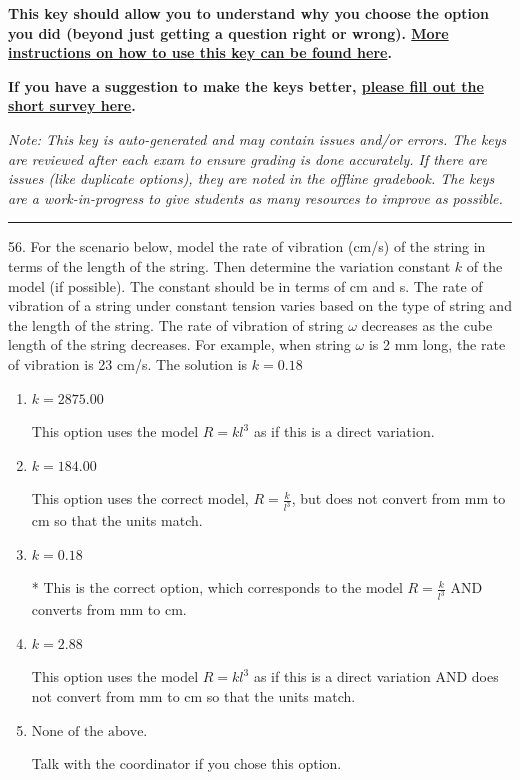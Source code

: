 \documentclass{extbook}[14pt]
\begin{document}
\textbf{This key should allow you to understand why you choose the option you did (beyond just getting a question right or wrong). \href{https://xronos.clas.ufl.edu/mac1105spring2020/courseDescriptionAndMisc/Exams/LearningFromResults}{More instructions on how to use this key can be found here}.}

\textbf{If you have a suggestion to make the keys better, \href{https://forms.gle/CZkbZmPbC9XALEE88}{please fill out the short survey here}.}

\textit{Note: This key is auto-generated and may contain issues and/or errors. The keys are reviewed after each exam to ensure grading is done accurately. If there are issues (like duplicate options), they are noted in the offline gradebook. The keys are a work-in-progress to give students as many resources to improve as possible.}

\rule{\textwidth}{0.4pt}

56. For the scenario below, model the rate of vibration (cm/s) of the string in terms of the length of the string. Then determine the variation constant $k$ of the model (if possible). The constant should be in terms of cm and s.
The rate of vibration of a string under constant tension varies based on the type of string and the length of the string. The rate of vibration of string $\omega$ decreases as the cube length of the string decreases. For example, when string $\omega$ is 2 mm long, the rate of vibration is 23 cm/s. 
The solution is $ k = 0.18 $ 

\begin{enumerate}[label=\Alph*.] 
\item $ k = 2875.00 $ 

 This option uses the model $R = kl^{3}$ as if this is a direct variation. 
\item $ k = 184.00 $ 

 This option uses the correct model, $R = \frac{k}{l^{3}}$, but does not convert from mm to cm so that the units match. 
\item $ k = 0.18 $ 

 * This is the correct option, which corresponds to the model $R = \frac{k}{l^{3}}$ AND converts from mm to cm. 
\item $ k = 2.88 $ 

 This option uses the model $R = kl^{3}$ as if this is a direct variation AND does not convert from mm to cm so that the units match. 
\item $ \text{None of the above.} $ 

 Talk with the coordinator if you chose this option. 
\end{enumerate} 
 
\end{document}
